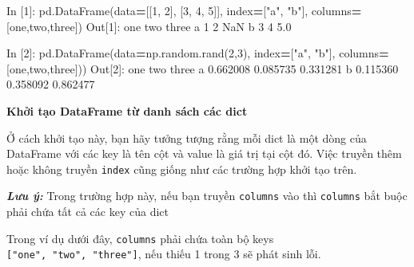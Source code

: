 \documentclass[
]{book}
\makeatletter
\newenvironment{Shaded}{\begin{snugshade}}{\end{snugshade}}
\newcommand{\DecValTok}[1]{\textcolor[rgb]{0.00,0.00,0.81}{#1}}
\newcommand{\FloatTok}[1]{\textcolor[rgb]{0.00,0.00,0.81}{#1}}
\newcommand{\NormalTok}[1]{#1}
\newcommand{\OperatorTok}[1]{\textcolor[rgb]{0.81,0.36,0.00}{\textbf{#1}}}
\newcommand{\StringTok}[1]{\textcolor[rgb]{0.31,0.60,0.02}{#1}}
\newenvironment{kframe}{%
\medskip{}
\setlength{\fboxsep}{.8em}
 \def\at@end@of@kframe{}%
 \ifinner\ifhmode%
  \def\at@end@of@kframe{\end{minipage}}%
  \begin{minipage}{\columnwidth}%
 \fi\fi%
 \def\FrameCommand##1{\hskip\@totalleftmargin \hskip-\fboxsep
 \colorbox{shadecolor}{##1}\hskip-\fboxsep
     \hskip-\linewidth \hskip-\@totalleftmargin \hskip\columnwidth}%
 \MakeFramed {\advance\hsize-\width
   \@totalleftmargin\z@ \linewidth\hsize
   \@setminipage}}%
 {\par\unskip\endMakeFramed%
 \at@end@of@kframe}
\newenvironment{rmdblock}[1]
  {
  \begin{itemize}
  \renewcommand{\labelitemi}{
    \raisebox{-.7\height}[0pt][0pt]{
      {\setkeys{Gin}{width=3em,keepaspectratio}\texttt{[image: images/\#1]}}
    }
  }
  \setlength{\fboxsep}{1em}
  \begin{kframe}
  \item
  }
  {
  \end{kframe}
  \end{itemize}
  }
\newenvironment{rmdnote}
  {\begin{rmdblock}{note}}
  {\end{rmdblock}}
\makeatother
\begin{document}
\begin{Shaded}
\begin{Highlighting}[]
\NormalTok{In [}\DecValTok{1}\NormalTok{]: pd.DataFrame(data}\OperatorTok{=}\NormalTok{[[}\DecValTok{1}\NormalTok{, }\DecValTok{2}\NormalTok{], [}\DecValTok{3}\NormalTok{, }\DecValTok{4}\NormalTok{, }\DecValTok{5}\NormalTok{]], }
\NormalTok{                     index}\OperatorTok{=}\NormalTok{[}\StringTok{"a"}\NormalTok{, }\StringTok{"b"}\NormalTok{], }
\NormalTok{                     columns}\OperatorTok{=}\NormalTok{[}\StringTok{\textquotesingle{}one\textquotesingle{}}\NormalTok{,}\StringTok{\textquotesingle{}two\textquotesingle{}}\NormalTok{,}\StringTok{\textquotesingle{}three\textquotesingle{}}\NormalTok{])}
\NormalTok{Out[}\DecValTok{1}\NormalTok{]: }
\NormalTok{   one  two  three}
\NormalTok{a    }\DecValTok{1}    \DecValTok{2}\NormalTok{    NaN}
\NormalTok{b    }\DecValTok{3}    \DecValTok{4}    \FloatTok{5.0}

\NormalTok{In [}\DecValTok{2}\NormalTok{]: pd.DataFrame(data}\OperatorTok{=}\NormalTok{np.random.rand(}\DecValTok{2}\NormalTok{,}\DecValTok{3}\NormalTok{), }
\NormalTok{                     index}\OperatorTok{=}\NormalTok{[}\StringTok{"a"}\NormalTok{, }\StringTok{"b"}\NormalTok{], }
\NormalTok{                     columns}\OperatorTok{=}\NormalTok{[}\StringTok{\textquotesingle{}one\textquotesingle{}}\NormalTok{,}\StringTok{\textquotesingle{}two\textquotesingle{}}\NormalTok{,}\StringTok{\textquotesingle{}three\textquotesingle{}}\NormalTok{]))}
\NormalTok{Out[}\DecValTok{2}\NormalTok{]:}
\NormalTok{        one       two     three}
\NormalTok{a  }\FloatTok{0.662008}  \FloatTok{0.085735}  \FloatTok{0.331281}
\NormalTok{b  }\FloatTok{0.115360}  \FloatTok{0.358092}  \FloatTok{0.862477}
\end{Highlighting}
\end{Shaded}

\textbf{Khởi tạo DataFrame từ danh sách các dict}

Ở cách khởi tạo này, bạn hãy tưởng tượng rằng mỗi dict là một dòng của DataFrame với các key là tên
cột và value là giá trị tại cột đó. Việc truyền thêm hoặc không truyền \texttt{index} cũng giống
như các trường hợp khởi tạo trên.

\begin{rmdnote}
\textbf{\emph{Lưu ý:}} Trong trường hợp này, nếu bạn truyền \texttt{columns} vào thì \texttt{columns} bắt buộc phải chứa tất cả
các key của dict
\end{rmdnote}

Trong ví dụ dưới đây, \texttt{columns} phải chứa toàn bộ keys \texttt{{[}"one",\ "two",\ "three"{]}}, nếu thiếu 1 trong 3
sẽ phát sinh lỗi.
\end{document}
